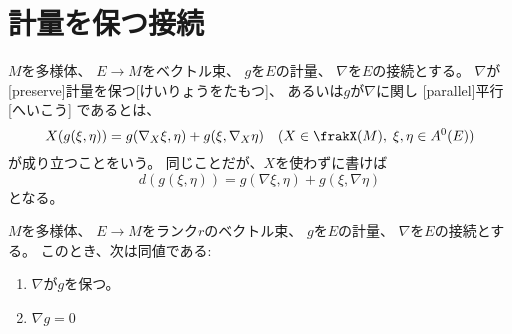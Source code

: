 \documentclass[report]{jlreq}
\begin{document}
\section{計量を保つ接続}


\begin{definition}[計量を保つ接続]
    $M$を多様体、
    $E \to M$をベクトル束、
    $g$を$E$の計量、
    $\nabla$を$E$の接続とする。
    $\nabla$が[preserve]{計量を保つ}[けいりょうをたもつ]、
    あるいは$g$が$\nabla$に関し
    [parallel]{平行}[へいこう]
    であるとは、
    \begin{equation}
        X(g(\xi, \eta)) = g(\nabla_X\xi, \eta) + g(\xi, \nabla_X\eta)
        \quad (X \in \frakX(M), \; \xi, \eta \in A^0(E))
    \end{equation}
    が成り立つことをいう。
    同じことだが、$X$を使わずに書けば
    \begin{equation}
        d(g(\xi, \eta)) = g(\nabla\xi, \eta) + g(\xi, \nabla\eta)
    \end{equation}
    となる。
\end{definition}

\begin{proposition}[計量を保つ接続の特徴付け]
    $M$を多様体、
    $E \to M$をランク$r$のベクトル束、
    $g$を$E$の計量、
    $\nabla$を$E$の接続とする。
    このとき、次は同値である:
    \begin{enumerate}
        \item $\nabla$が$g$を保つ。
        \item $\nabla g = 0$
    \end{enumerate}
\end{proposition}
\end{document}
